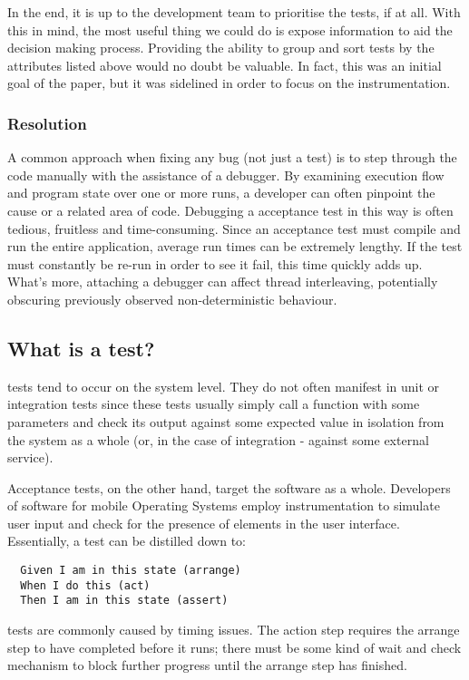 In the end, it is up to the development team to prioritise the \flaky tests, if at all. With this in mind, the most useful thing we could do is expose information to aid the decision making process. Providing the ability to group and sort \flaky tests by the attributes listed above would no doubt be valuable. In fact, this was an initial goal of the paper, but it was sidelined in order to focus on the instrumentation.

\subsubsection{Resolution}

A common approach when fixing any bug (not just a \flaky test) is to step through the code manually with the assistance of a debugger. By examining execution flow and program state over one or more runs, a developer can often pinpoint the cause or a related area of code. Debugging a \flaky acceptance test in this way is often tedious, fruitless and time-consuming. Since an acceptance test must compile and run the entire application, average run times can be extremely lengthy. If the test must constantly be re-run in order to see it fail, this time quickly adds up. What's more, attaching a debugger can affect thread interleaving, potentially obscuring previously observed non-deterministic behaviour.

\subsection{What is a \flaky test?}


\flaky tests tend to occur on the system level. They do not often manifest in unit or integration tests since these tests usually simply call a function with some parameters and check its output against some expected value in isolation from the system as a whole (or, in the case of integration - against some external service).

Acceptance tests, on the other hand, target the software as a whole. Developers of software for mobile Operating Systems employ instrumentation to simulate user input and check for the presence of elements in the user interface. Essentially, a test can be distilled down to:
\begin{verbatim}
  Given I am in this state (arrange)
  When I do this (act)
  Then I am in this state (assert)
\end{verbatim}

\flaky tests are commonly caused by timing issues. The action step requires the arrange step to have completed before it runs; there must be some kind of wait and check mechanism to block further progress until the arrange step has finished.

